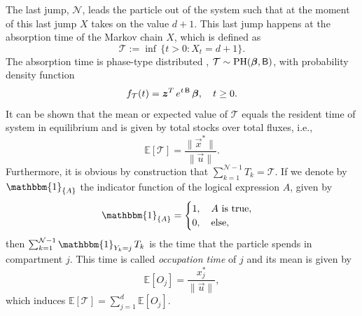 \documentclass[smallextended]{svjour3}
\makeatletter
\renewcommand*{\eqref}[1]{%
  \hyperref[{#1}]{\textup{\tagform@{\ref*{#1}}}}%
}
\newcommand{\E}{\mathbb{E}}
\newcommand{\TT}{\mathcal{T}}
\newcommand{\PH}{\operatorname{PH}}
\newcommand{\vnorms}[1]{\|#1\|}
\newcommand{\pdf}{probability density function}
\makeatother
\begin{document}
The last jump, $\mathcal{N}$, leads the particle out of the system such that at the moment of this last jump $X$ takes on the value $d+1$.
This last jump happens at the absorption time of the Markov chain $X$, which is defined as
\begin{equation*}
   \TT := \inf\,\{t>0: X_t=d+1\}.
\end{equation*}
The absorption time is phase-type distributed \citep{Neuts1981}, $\TT\sim\PH(\vec{\beta},\tens{B})$, with \pdf
\begin{equation*}
  f_{\TT}(t) = \vec{z}^T\,e^{t\,\tens{B}}\,\vec{\beta},\quad t\geq0.
\end{equation*}
It can be shown \citep[Section 3.2]{Metzler2018MGS} that the mean or expected value of $\TT$ equals the resident time \citep{Sierra2016GlobChangBiol} of system \eqref{eqn:lin_CS_sys} in equilibrium and is given by total stocks over total fluxes, i.e., 
\begin{equation*}
  \E\left[\TT\right] = \frac{\vnorms{\vec{x}^\ast}}{\vnorms{\vec{u}}}.
\end{equation*}
Furthermore, it is obvious by construction that $\sum_{k=1}^{\mathcal{N}-1} T_k = \TT$.
If we denote by $\mathbbm{1}_{\{A\}}$ the indicator function of the logical expression $A$, given by
\begin{equation*}
  \mathbbm{1}_{\{A\}} =
  \begin{cases}
    1, \quad A\text{ is true},\\
    0, \quad\text{else},
  \end{cases}
\end{equation*}
then $\sum_{k=1}^{\mathcal{N}-1} \mathbbm{1}_{Y_k=j}\,T_k$ is the time that the particle spends in compartment $j$.
This time is called \emph{occupation time} of $j$ and its mean is given by \citep[Section 3.3]{Metzler2018MGS}
\begin{equation}
  \label{eqn:occupation_time}
  \E\left[O_j\right] = \frac{x^\ast_j}{\vnorms{\vec{u}}},
\end{equation}
which induces $\E\left[\TT\right] = \sum_{j=1}^d \E\left[O_j\right]$.
\end{document}
